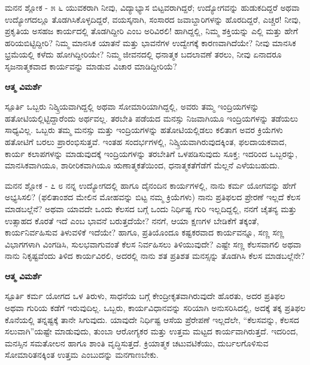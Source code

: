 \newpage
\begin{mananam}{\mananamfont \large ಮನನ ಶ್ಲೋಕ - ೫ ೬}
\mananamtext ಯುವಕರಾಗಿ ನೀವು, ವಿದ್ಯಾಭ್ಯಾಸ ಬಿಟ್ಟವರಾಗಿದ್ದರೆ; ಉದ್ಯೋಗವನ್ನು ಹುಡುಕದಿದ್ದರೆ ಅಥವಾ ಉದ್ಯೋಗದಲ್ಲೂ ತೊಡಗಿಸಿಕೊಳ್ಳದಿದ್ದರೆ, ವಯಸ್ಕನಾಗಿ, ಸಂಸಾರದ ಜವಾಬ್ದಾರಿಗಳನ್ನು ಹೊರದಿದ್ದರೆ, ಎಚ್ಚರ! ನೀವು, ಪ್ರಕೃತಿಯ ಅಸಹಜ ಕಾರ್ಯದಲ್ಲಿ ತೊಡಗಿದ್ದೀರಿ ಎಂಬ ಅರಿವಿರಲಿ! ಹಾಗಿದ್ದಲ್ಲಿ, ನಿಮ್ಮ ಶಕ್ತಿಯನ್ನು ಎಲ್ಲಿ ಮತ್ತು ಹೇಗೆ ಹರಿಯಬಿಟ್ಟಿದ್ದೀರಿ? ನಿಮ್ಮ ಮಾನಸಿಕ ಯಾತನೆ ಮತ್ತು ಭಾವನೆಗಳ ಉದ್ವೇಗಕ್ಕೆ ಕಾರಣವಾಗಿದೆಯೇ? ನೀವು ಮಾನಸಿಕ ಭ್ರಮೆಯಲ್ಲಿ ಕಳೆದು ಹೋಗಿದ್ದೀರಿಯೇ? ನಿಮ್ಮ ಜೀವನದಲ್ಲಿ ಧನಾತ್ಮಕ ಬದಲಾವಣೆ ತರಲು, ನೀವು ಏನಾದರೂ ಸೃಜನಾತ್ಮಕವಾದ ಕಾರ್ಯವನ್ನು ಮಾಡುವ ವಿಚಾರ ಮಾಡಿದ್ದೀರಿಯೆ?
\end{mananam}
\WritingHand\enspace\textbf{ಆತ್ಮ ವಿಮರ್ಶೆ}\\
\begin{inspiration}{\mananamfont \large ಸ್ಪೂರ್ತಿ}
\mananamtext ಒಬ್ಬರು ನಿಶ್ಕ್ರಿಯವಾಗಿದ್ದಲ್ಲಿ ಅಥವಾ ಸೋಮಾರಿಯಾಗಿದ್ದಲ್ಲಿ, ಅವರು ತಮ್ಮ ಇಂದ್ರಿಯಗಳನ್ನು ಹತೋಟಿಯಲ್ಲಿಟ್ಟಿದ್ದಾರೆಂದು ಅರ್ಥವಲ್ಲ. ತರಬೇತಿ ಪಡೆಯದ ಮನಸ್ಸು ನಿಜವಾಗಿಯೂ ಇಂದ್ರಿಯಗಳನ್ನು ತಡೆಯಲು ಸಾಧ್ಯವಿಲ್ಲ. ಒಬ್ಬರು ತಮ್ಮ ಮನಸ್ಸು ಮತ್ತು ಇಂದ್ರಿಯಗಳನ್ನು ಹತೋಟಿಯಲ್ಲಿಡಲು ಕಲಿತಾಗ ಅವರ ಕ್ರಿಯೆಗಳು ಹತೋಟಿಗೆ ಬರಲು ಪ್ರಾರಂಭಿಸುತ್ತವೆ. ಇಂತಹ ಸಂದರ್ಭಗಳಲ್ಲಿ, ನಿಶ್ಕ್ರಿಯವಾಗಿರುವುದಕ್ಕಿಂತ, ಫಲದಾಯಕವಾದ, ಕಾರ್ಯ ಕಲಾಪಗಳನ್ನು ಮಾಡುವುದಕ್ಕೆ ಇಂದ್ರಿಯಗಳನ್ನು ತರಬೇತಿಗೆ ಒಳಪಡಿಸುವುದು ಸೂಕ್ತ; ಇದರಿಂದ ಒಬ್ಬರನ್ನು, ಮಾನಸಿಕವಾಗಿಯೂ, ಶಾರೀರಿಕವಾಗಿಯೂ ಋಣಾತ್ಮಕತೆಯಿಂದ, ಧನಾತ್ಮಕತೆಗೆಡೆಗೆ ಮೆಲ್ಲನೆ ಎಳೆಯಬಹುದು.
\end{inspiration}
\newpage

\begin{mananam}{\mananamfont \large ಮನನ ಶ್ಲೋಕ - ೭ ೮}
\mananamtext ನನ್ನ ಉದ್ಯೋಗದಲ್ಲಿ ಹಾಗೂ ದೈನಂದಿನ ಕಾರ್ಯಗಳಲ್ಲಿ, ನಾನು ಕರ್ಮ ಯೋಗವನ್ನು ಹೇಗೆ ಅಭ್ಯಸಿಸಲಿ? (ಫಲಿತಾಂಶದ ಮೇಲಿನ ಮೋಹವನ್ನು ಬಿಟ್ಟ ನಮ್ಮ ಕ್ರಿಯೆಗಳು) ನಾನು ಪ್ರತಿಫಲದ ಪ್ರೇರಣೆ ಇಲ್ಲದೆ ಕೆಲಸ ಮಾಡಬಲ್ಲೆನೆ? ಅಥವಾ ಯಾವದೇ ಒಂದು ಕೆಲಸದ ಬಗ್ಗೆ ಒಂದು ನಿರ್ಧಿಷ್ಟ ಗುರಿ ಇಲ್ಲದಿದ್ದಲ್ಲಿ, ನನಗೆ ಚೈತನ್ಯ ಮತ್ತು ಉತ್ಸಾಹದ ಕೊರತೆ ಇದೆ ಎಂಬ ಭಾವನೆ ಬರುತ್ತದೆಯೇ? ನನಗೆ, ಆಯಾ ಕ್ಷಣಗಳ ಬೇಡಿಕೆಗೆ ತಕ್ಕಂತೆ, ಕಾರ್ಯನಿರ್ವಹಿಸುವ ತಿಳುವಳಿಕೆ ಇದೆಯೇ? ಹಾಗೂ, ಪ್ರತಿಯೊಂದೂ ಕಷ್ಟಕರವಾದ ಕಾರ್ಯವನ್ನೂ, ಸಣ್ಣ ಸಣ್ಣ ವಿಭಾಗಗಳಾಗಿ ವಿಂಗಡಿಸಿ, ಸುಲಭವಾಗುವಂತೆ ಕೆಲಸ ನಿರ್ವಹಿಸಲು ತಿಳಿಯುವುದೇ? ಎಷ್ಟೇ ಸಣ್ಣ ಕೆಲಸವಾಗಲಿ ಅಥವಾ ನಾನು ನಿಕೃಷ್ಟವೆಂದು ತಿಳಿದ ಕಾರ್ಯವಿರಲಿ, ಅದರಲ್ಲಿ ನಾನು ಶತ ಪ್ರತಿಶತ ಮನಸ್ಸನ್ನು ತೊಡಗಿಸಿ ಕೆಲಸ ಮಾಡಬಲ್ಲೆನೇ?
\end{mananam}
\WritingHand\enspace\textbf{ಆತ್ಮ ವಿಮರ್ಶೆ}\\
\begin{inspiration}{\mananamfont \large ಸ್ಪೂರ್ತಿ}
\mananamtext  ಕರ್ಮ ಯೋಗದ ಒಳ ತಿರುಳು, ಸಾಧನೆಯ ಬಗ್ಗೆ  ಕೇಂದ್ರೀಕೃತವಾಗಿರುವುದೇ ಹೊರತು, ಅದರ ಪ್ರತಿಫಲ ಅಥವಾ ಗುರಿಯ ಕಡೆಗೆ ಇರುವುದಿಲ್ಲ. ಒಬ್ಬರು, ಕಾರ್ಯವಿಧಾನವನ್ನು ಸರಿಯಾಗಿ ಅನುಸರಿಸಿದಲ್ಲಿ, ಅದಕ್ಕೆ ತಕ್ಕ ಪ್ರತಿಫಲ ಕೊನೆಯಲ್ಲಿ  ತನ್ನಷ್ಟಕ್ಕೆ ತಾನೇ ಸಿಗುವುದು. ಯಾವುದೇ ನಿರ್ಧಿಷ್ಟ ಆಸೆಯ ಪ್ರೆರೇಪಣೆ ಇಲ್ಲದೆಲೇ, “ಕೆಲಸವನ್ನು, ಕೆಲಸದ ಸಲುವಾಗಿ”ಯಷ್ಟೇ ಮಾಡುವುದು, ತುಂಬಾ ಆರೋಗ್ಯಕರ ಮತ್ತು ಉತ್ತಮ ಮಟ್ಟದ ಕಾರ್ಯವಾಗಿರುತ್ತದೆ. ಇದರಿಂದ, ಮನಸ್ಸಿನ ಸಮತೋಲನ ಹಾಗೂ ಶಾಂತಿ ವೃದ್ಧಿಸುತ್ತದೆ. ಕ್ರಿಯಾತ್ಮಕ ಚಟುವಟಿಕೆಯು, ದುರ್ಬಲಗೊಳಿಸುವ ಸೋಮಾರಿತನಕ್ಕಿಂತ ಉತ್ತಮ ಎಂಬುದನ್ನು ಮನಗಾಣಬೇಕು. 
\end{inspiration}
\newpage

